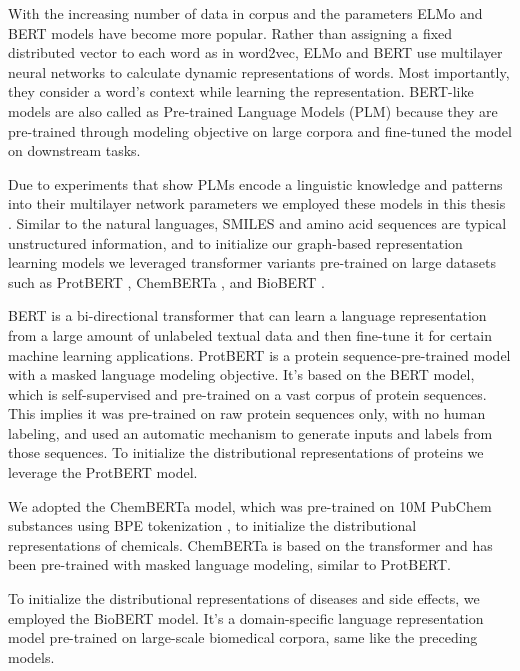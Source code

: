 With the increasing number of data in corpus and the parameters ELMo \cite{devlin2018bert} and BERT \cite{peters2018deep} models have become more popular. Rather than assigning a fixed distributed vector to each word as in word2vec, ELMo and BERT use multilayer neural networks to calculate dynamic representations of words. Most importantly, they consider a word's context while learning the representation. BERT-like models are also called as Pre-trained Language Models (PLM) because they are pre-trained through modeling objective on large corpora and fine-tuned the model on downstream tasks. 

Due to experiments that show PLMs encode a linguistic knowledge and patterns into their multilayer network parameters we employed these models in this thesis \cite{liu2019linguistic, hewitt2019structural}. Similar to the natural languages, SMILES and amino acid sequences are typical unstructured information, and to initialize our graph-based representation learning models we leveraged transformer variants pre-trained on large datasets such as ProtBERT \cite{Elnaggar2020.07.12.199554}, ChemBERTa \cite{chithrananda2020chemberta}, and BioBERT \cite{lee2020biobert}. 

BERT is a bi-directional transformer that can learn a language representation from a large amount of unlabeled textual data and then fine-tune it for certain machine learning applications. ProtBERT \cite{prot_bert, Elnaggar2020.07.12.199554} is a protein sequence-pre-trained model with a masked language modeling objective. It's based on the BERT model, which is self-supervised and pre-trained on a vast corpus of protein sequences. This implies it was pre-trained on raw protein sequences only, with no human labeling, and used an automatic mechanism to generate inputs and labels from those sequences. To initialize the distributional representations of proteins we leverage the ProtBERT model. 

We adopted the ChemBERTa \cite{chithrananda2020chemberta} model, which was pre-trained on 10M PubChem substances using BPE tokenization \cite{sennrich2015neural}, to initialize the distributional representations of chemicals. ChemBERTa is based on the transformer and has been pre-trained with masked language modeling, similar to ProtBERT.

To initialize the distributional representations of diseases and side effects, we employed the BioBERT \cite{lee2020biobert} model. It's a domain-specific language representation model pre-trained on large-scale biomedical corpora, same like the preceding models.

